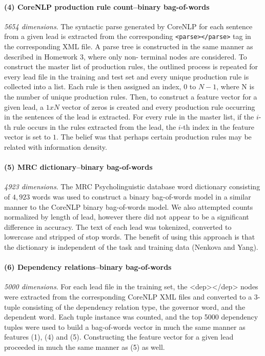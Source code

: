 \documentclass[
10pt, %
a4paper, %
oneside, %
headinclude,footinclude, %
BCOR5mm, %
]{scrartcl}
\begin{document}
\paragraph{\textbf{(4) CoreNLP production rule count--binary bag-of-words}}
\hfill \newline \noindent \textit{5654 dimensions}. The syntactic parse
generated by CoreNLP for each sentence from a given lead is extracted from the
corresponding \texttt{<parse></parse>} tag in the corresponding XML file. A
parse tree is constructed in the same manner as described in Homework 3, where
only non- terminal nodes are considered. To construct the master list of
production rules, the outlined process is repeated for every lead file in the
training and test set and every unique production rule is collected into a list.
Each rule is then assigned an index, $0$ to $N-1$, where N is the number of
unique production rules. Then, to construct a feature vector for a given lead, a
$1 x N$ vector of zeros is created and every production rule occurring in the
sentences of the lead is extracted. For every rule in the master list, if the
$i$-th rule occurs in the rules extracted from the lead, the $i$-th index in the
feature vector is set to $1$. The belief was that perhaps certain production
rules may be related with information density.

\paragraph{\textbf{(5) MRC dictionary--binary bag-of-words}}
\hfill \newline \noindent \textit{4923 dimensions}. 
The MRC Psycholinguistic database word dictionary consisting of $4,923$ words
was used to construct a binary bag-of-words model in a similar manner to the
CoreNLP binary bag-of-words model. We also attempted counts normalized by length
of lead, however there did not appear to be a significant difference in
accuracy. The text of each lead was tokenized, converted to lowercase and
stripped of stop words. The benefit of using this approach is that the
dictionary is independent of the task and training data (Nenkova and Yang).

\paragraph{\textbf{(6) Dependency relations--binary bag-of-words}}
\hfill \newline \noindent \textit{5000 dimensions}. 
For each lead file in the training set, the <dep></dep> nodes were extracted 
from the corresponding CoreNLP XML files and converted to a 3-tuple consisting 
of the dependency relation type, the governor word, and the dependent word. 
Each tuple instance was counted, and the top 5000 dependency tuples were used 
to build a bag-of-words vector in much the same manner as features (1), (4)
and (5). Constructing the feature vector for a given lead proceeded in much the
same manner as (5) as well. 
\end{document}
